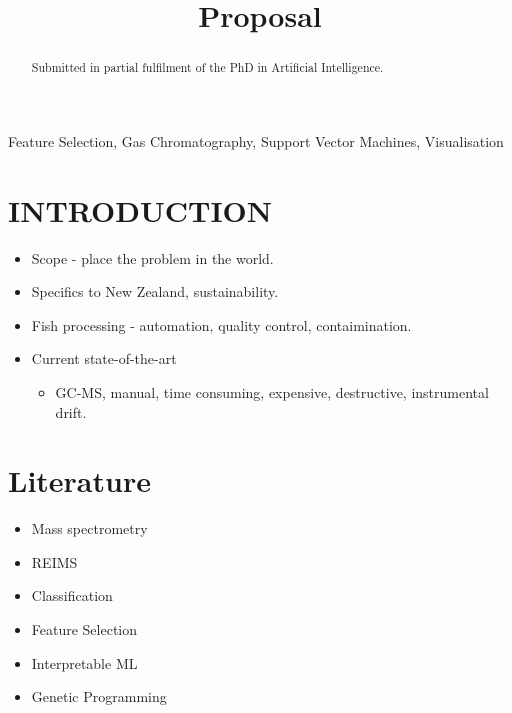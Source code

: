 \documentclass{article}
\title{Proposal}
\begin{document}
\maketitle
%
\begin{abstract}

  Submitted in partial fulfilment of the PhD in Artificial Intelligence.

\end{abstract}
%
\begin{keywords}
  Feature Selection, Gas Chromatography, Support Vector Machines, Visualisation
\end{keywords}
%

\section{INTRODUCTION}
\label{sec:introduction}

\begin{itemize}
  \item Scope - place the problem in the world. 
  \item Specifics to New Zealand, sustainability. 
  \item Fish processing - automation, quality control, contaimination. 
  \item Current state-of-the-art
  \begin{itemize}
    \item GC-MS, manual, time consuming, expensive, destructive, instrumental drift. 
  \end{itemize}
\end{itemize}

\section{Literature}
\label{sec:literature} 

\begin{itemize}
  \item Mass spectrometry \cite{eder1995gas}
  \item REIMS 
  \item Classification 
  \item Feature Selection 
  \item Interpretable ML 
  \item Genetic Programming 
\end{itemize}
\end{document}
